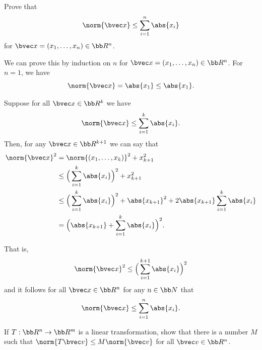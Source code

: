 \documentclass[12pt, letterpaper]{hmcpset}
\begin{document}
\begin{problem}[1]
	Prove that
	\[
		\norm{\bvec x} \le \sum_{i = 1}^n \abs{x_i}
	\]
	for $\bvec x = (x_1, \ldots, x_n) \in \bb R^n$.
\end{problem}

\begin{solution}
	We can prove this by induction on $n$ for $\bvec x = (x_{1}, \dots, x_{n}) \in \bb R^n$. For $n = 1$, we have
	\[
		\norm{\bvec x} = \abs{x_1} \le \abs{x_1}.
	\]

	Suppose for all $\bvec x \in \bb R^k$ we have
	\[
		\norm{\bvec x} \le \sum_{i = 1}^k \abs{x_i}.
	\]
	Then, for any $\bvec x \in \bb R^{k + 1}$ we can say that
	\[
		\begin{split}
			\norm{\bvec x}^2 & = \norm{(x_{1}, \dots, x_{k})}^2 + x_{k + 1}^2 \\
						 & \le \Big ( \sum_{i = 1}^k \abs{x_i} \Big )^2 + x_{k + 1}^2 \\
						 & \le \Big ( \sum_{i = 1}^k \abs{x_i} \Big )^2 + \abs{x_{k + 1}}^2 + 2 \abs{x_{k + 1}} \sum_{i = 1}^k \abs{x_i} \\
						 & = \Big ( \abs{x_{k + 1}} + \sum_{i = 1}^k \abs{x_i} \Big )^2.
		\end{split}
	\]
	
	That is,
	\[
		\norm{\bvec x}^2 \le \Big ( \sum_{i = 1}^{k + 1} \abs{x_i} \Big )^2
	\]
	and it follows for all $\bvec x \in \bb R^n$ for any $n \in \bb N$ that
	\[
		\norm{\bvec x} \le \sum_{i = 1}^n \abs{x_i}.
	\]
\end{solution}

\pagebreak

\begin{problem}[10]
	If $T : \bb R^n \to \bb R^m$ is a linear transformation, show that there is a number $M$ such that $\norm{T \bvec v} \le M \norm{\bvec v}$ for all $\bvec v \in \bb R^n$.
\end{problem}
\end{document}
